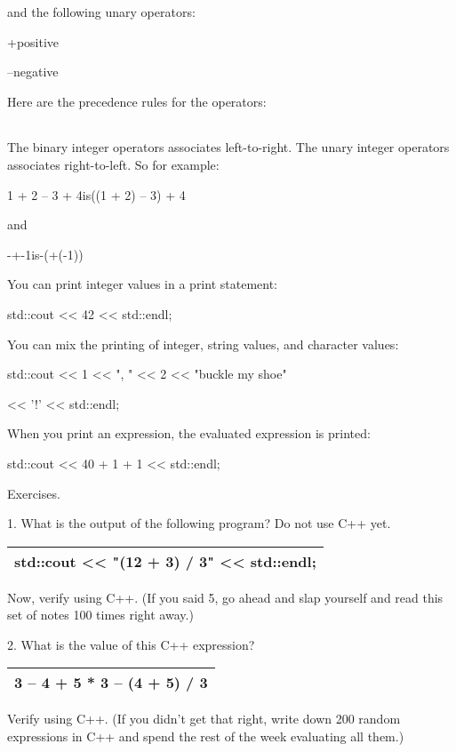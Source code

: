 \documentclass[
]{article}
\begin{document}
and the following unary operators:

+positive

--negative

Here are the precedence rules for the operators:

\begin{longtable}[]{@{}@{}}
\toprule
\endhead
\bottomrule
\end{longtable}

The binary integer operators associates left-to-right. The unary integer
operators associates right-to-left. So for example:

1 + 2 -- 3 + 4is((1 + 2) -- 3) + 4

and

-+-1is-(+(-1))

You can print integer values in a print statement:

std::cout \textless\textless{} 42 \textless\textless{} std::endl;

You can mix the printing of integer, string values, and character
values:

std::cout \textless\textless{} 1 \textless\textless{} ", "
\textless\textless{} 2 \textless\textless{} "buckle my shoe"

\textless\textless{} '!' \textless\textless{} std::endl;

When you print an expression, the evaluated expression is printed:

std::cout \textless\textless{} 40 + 1 + 1 \textless\textless{}
std::endl;

Exercises.

1. What is the output of the following program? Do not use C++ yet.

\begin{longtable}[]{@{}l@{}}
\toprule
\endhead
std::cout \textless\textless{} "(12 + 3) / 3" \textless\textless{}
std::endl;\tabularnewline
\bottomrule
\end{longtable}

Now, verify using C++. (If you said 5, go ahead and slap yourself and
read this set of notes 100 times right away.)

2. What is the value of this C++ expression?

\begin{longtable}[]{@{}l@{}}
\toprule
\endhead
3 -- 4 + 5 * 3 -- (4 + 5) / 3\tabularnewline
\bottomrule
\end{longtable}

Verify using C++. (If you didn't get that right, write down 200 random
expressions in C++ and spend the rest of the week evaluating all them.)
\end{document}
